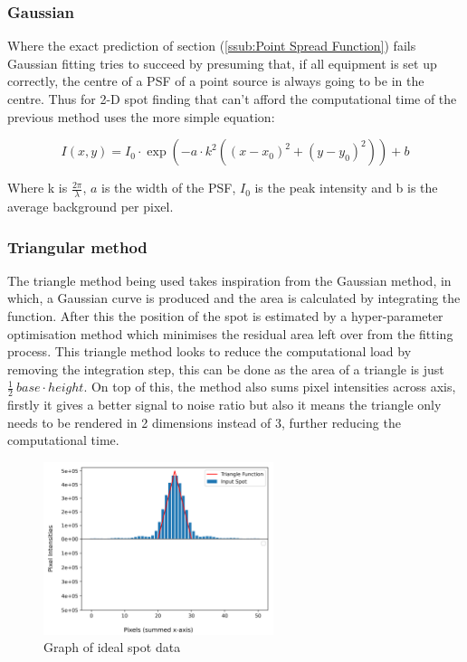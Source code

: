 \documentclass[aps,pra,a4paper,nofootinbib,onecolumn,tightenlines,longbibliography,12pt,amsfonts,amssymb,amsmath,floatfix]{revtex4-2} %
\begin{document}
    \subsubsection{Gaussian} %
    \label{ssub:Gaussian}

    Where the exact prediction of section (\ref{ssub:Point Spread Function}) fails Gaussian fitting tries to succeed 
    by presuming that, if all equipment is set up correctly, the centre of a PSF of a point source is 
    always going to be in the centre. Thus for 2-D spot finding that can't afford the computational time of 
    the previous method uses the more simple equation:

    $$I(x,y)=I_0\cdot \exp(-a\cdot k^2((x-x_0)^2+(y-y_0)^2))+b$$

    Where k is $\frac{2\pi}{\lambda}$, $a$ is the width of the PSF, $I_0$ is the peak intensity and b is the average background per pixel. \cite{small2014fluorophore}

    
    \subsubsection{Triangular method} %
    \label{ssub:Triangular method}
    
    The triangle method being used takes inspiration from the Gaussian method, in which,
    a Gaussian curve is produced and the area is calculated by integrating the function. 
    After this the position of the spot is estimated by a hyper-parameter optimisation method 
    which minimises the residual area left over from the fitting process.
    This triangle method looks to reduce the computational load by removing the integration step, 
    this can be done as the area of a triangle is just $\frac{1}{2}\ base\cdot height$. 
    On top of this, the method also sums pixel intensities across axis, firstly it gives a 
    better signal to noise ratio but also it means the triangle only needs to be rendered in 2 dimensions 
    instead of 3, further reducing the computational time. 

    \begin{figure}[H]
      \begin{center}
        \includegraphics[width=0.6\textwidth]{project_pics/visual_test_2.png}
      \end{center}
      \caption{Graph of ideal spot data}
      \label{fig:visual_test_2}
    \end{figure}
\end{document}

